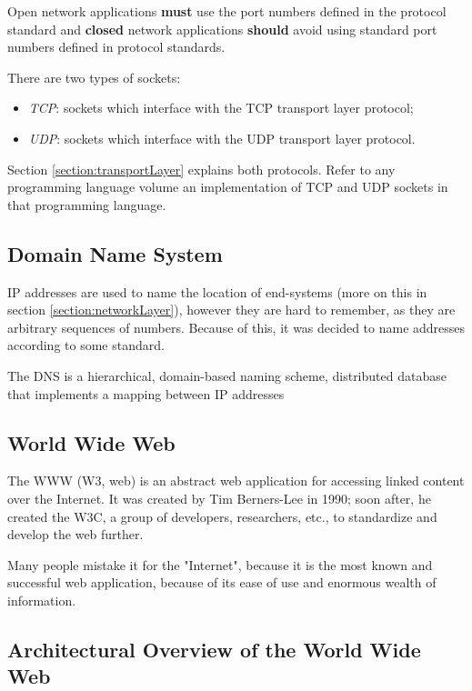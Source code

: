 Open network applications \textbf{must} use the port numbers defined in the protocol standard and \textbf{closed} network applications \textbf{should} avoid using standard port numbers defined in protocol standards.

There are two types of sockets:

\begin{itemize}
  \item \textit{\acs{TCP}}: sockets which interface with the \acs{TCP} transport layer protocol;
  \item \textit{\acs{UDP}}: sockets which interface with the \acs{UDP} transport layer protocol.
\end{itemize}

Section \ref{section:transportLayer} explains both protocols. Refer to any programming language volume an implementation of \acs{TCP} and \acs{UDP} sockets in that programming language.

\subsection{Domain Name System}
\label{subsection:dns}
\acs{IP} addresses are used to name the location of end-systems (more on this in section \ref{section:networkLayer}), however they are hard to remember, as they are arbitrary sequences of numbers. Because of this, it was decided to name addresses according to some standard.

The \ac{DNS} is a hierarchical, domain-based naming scheme, distributed database that implements a mapping between \acs{IP} addresses 



\subsection{World Wide Web}
\label{subsection:www}

The \ac{WWW} (W3, web) is an abstract web application for accessing linked content over the Internet. It was created by Tim Berners-Lee in 1990; soon after, he created the \ac{W3C}, a group of developers, researchers, etc., to standardize and develop the web further.

Many people mistake it for the "Internet", because it is the most known and successful web application, because of its ease of use and enormous wealth of information.

\subsection{Architectural Overview of the World Wide Web}
\label{subsection:architecturalOverviewOfTheWWW}

